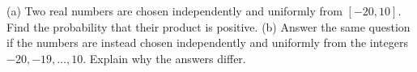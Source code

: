 (a) Two real numbers are chosen independently and uniformly from $[-20,10]$. Find the probability that their product is positive.
(b) Answer the same question if the numbers are instead chosen independently and uniformly from the integers $-20,-19,\ldots,10$. Explain why the answers differ.
